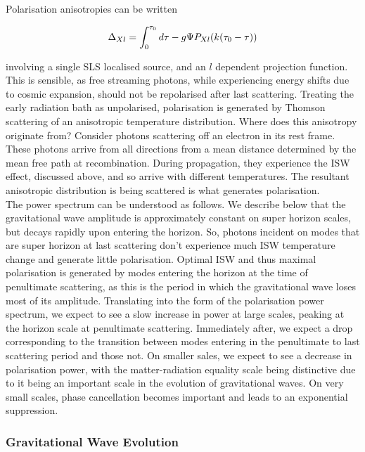 \documentclass[a4paper,10pt]{article}
\begin{document}
Polarisation anisotropies can be written

\begin{equation}
\Delta_{Xl} = \int_0^{\tau_0} d\tau -g\Psi P_{Xl}(k(\tau_0-\tau))\\
\end{equation}

involving a single SLS localised source, and an $l$ dependent projection function. This is sensible, as free streaming photons, while experiencing energy shifts due to cosmic expansion, should not be repolarised after last scattering. Treating the early radiation bath as unpolarised, polarisation is generated by Thomson scattering of an anisotropic temperature distribution. Where does this anisotropy originate from? Consider photons scattering off an electron in its rest frame. These photons arrive from all directions from a mean distance determined by the mean free path at recombination. During propagation, they experience the ISW effect, discussed above, and so arrive with different temperatures. The resultant anisotropic distribution is being scattered is what generates polarisation. \\

The power spectrum can be understood as follows. We describe below that the gravitational wave amplitude is approximately constant on super horizon scales, but decays rapidly upon entering the horizon. So, photons incident on modes that are super horizon at last scattering don't experience much ISW temperature change and generate little polarisation. Optimal ISW and thus maximal polarisation is generated by modes entering the horizon at the time of penultimate scattering, as this is the period in which the gravitational wave loses most of its amplitude. Translating into the form of the polarisation power spectrum, we expect to see a slow increase in power at large scales, peaking at the horizon scale at penultimate scattering. Immediately after, we expect a drop corresponding to the transition between modes entering in the penultimate to last scattering period and those not. On smaller sales, we expect to see a decrease in polarisation power, with the matter-radiation equality scale being distinctive due to it being an important scale in the evolution of gravitational waves. On very small scales, phase cancellation becomes important and leads to an exponential suppression. 

\subsubsection{Gravitational Wave Evolution}
\end{document}
